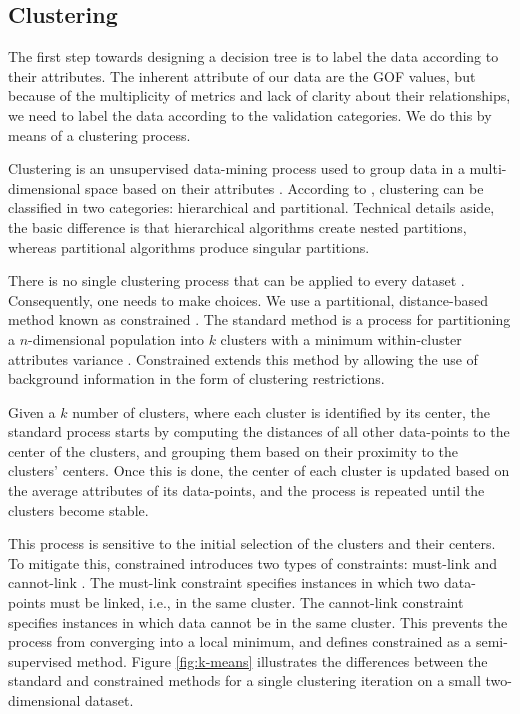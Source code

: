 \subsection{Clustering}
\label{sec:clustering}

The first step towards designing a decision tree is to label the data according to their attributes. The inherent attribute of our data are the GOF values, but because of the multiplicity of metrics and lack of clarity about their relationships, we need to label the data according to the validation categories. We do this by means of a clustering process. 

Clustering is an unsupervised data-mining process used to group data in a multi-dimensional space based on their attributes \citep{Fayyad_1996_IEEE}. According to \citet{Jain_1999_ACMCS}, clustering can be classified in two categories: hierarchical and partitional. Technical details aside, the basic difference is that hierarchical algorithms create nested partitions, whereas partitional algorithms produce singular partitions. 

There is no single clustering process that can be applied to every dataset \citep{Dy_2004_MLR, Jain_1988_Book, Hartigan_1985_JOC}. Consequently, one needs to make choices. We use a partitional, distance-based method known as constrained \kmeans{}. The standard \kmeans{} method is a process for partitioning a $n$-dimensional population into $k$ clusters with a minimum within-cluster attributes variance \citep[e.g.,][]{Macqueen_1967_Proc}. Constrained \kmeans{} extends this method by allowing the use of background information in the form of clustering restrictions.

Given a $k$ number of clusters, where each cluster is identified by its center, the standard process starts by computing the distances of all other data-points to the center of the clusters, and grouping them based on their proximity to the clusters' centers. Once this is done, the center of each cluster is updated based on the average attributes of its data-points, and the process is repeated until the clusters become stable.

This process is sensitive to the initial selection of the clusters and their centers. To mitigate this, constrained \kmeans{} introduces two types of constraints: must-link and cannot-link \citep{Wagstaff_2001_Proc}. The must-link constraint specifies instances in which two data-points must be linked, i.e., in the same cluster. The cannot-link constraint specifies instances in which data cannot be in the same cluster. This prevents the process from converging into a local minimum, and defines constrained \kmeans{} as a semi-supervised method. Figure \ref{fig:k-means} illustrates the differences between the standard and constrained \kmeans{} methods for a single clustering iteration on a small two-dimensional dataset.

